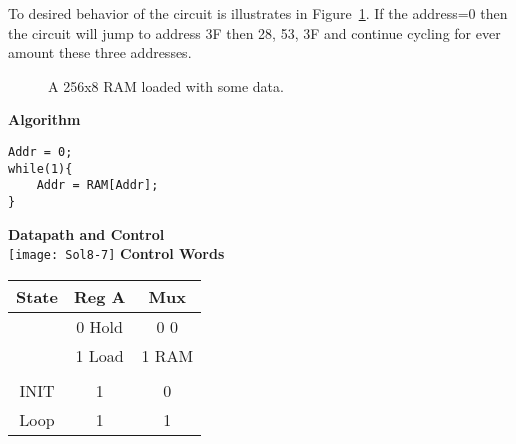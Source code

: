 \begin{enumerate}
        To desired behavior of the circuit is illustrates in
        Figure~\ref{fig:RAMhopper}.  If the address=0 then the circuit will
        jump to address 3F then 28, 53, 3F and continue cycling
        for ever amount these three addresses.

        \begin{figure}[ht]
            \caption{A 256x8 RAM loaded with some data.}
            \label{fig:RAMhopper}
        \end{figure}
        \begin{onlysolution}[fragile]
            \textbf{Algorithm}
              \begin{verbatim}
Addr = 0;
while(1){
    Addr = RAM[Addr];
}
\end{verbatim}
            \filbreak
            \textbf{Datapath and Control}\\
            \texttt{[image: Sol8-7]}
            \textbf{Control Words}\par
            \begin{tabular}{c|c|c}
                State & Reg A  & Mux   \\ \hline
                & 0 Hold & 0 0   \\ \hline
                & 1 Load & 1 RAM \\ \hline
                &        &       \\ \hline
                INIT  & 1      & 0     \\ \hline
                Loop  & 1      & 1     \\
            \end{tabular}


\end{onlysolution}
\end{enumerate}
